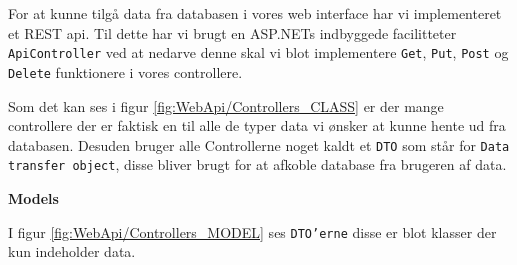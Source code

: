 For at kunne tilgå data fra databasen i vores web interface har vi implementeret et REST api. Til dette har vi brugt en ASP.NETs indbyggede facilitteter \texttt{ApiController} ved at nedarve denne skal vi blot implementere \texttt{Get}, \texttt{Put}, \texttt{Post} og \texttt{Delete} funktionere i vores controllere.


Som det kan ses i figur \ref{fig:WebApi/Controllers_CLASS} er der mange controllere der er faktisk en til alle de typer data vi ønsker at kunne hente ud fra databasen. Desuden bruger alle Controllerne noget kaldt et \texttt{DTO} som står for \texttt{Data transfer object}, disse bliver brugt for at afkoble database fra brugeren af data.
\newline

\textbf{Models}

I figur \ref{fig:WebApi/Controllers_MODEL} ses \texttt{DTO'erne} disse er blot klasser der kun indeholder data.

